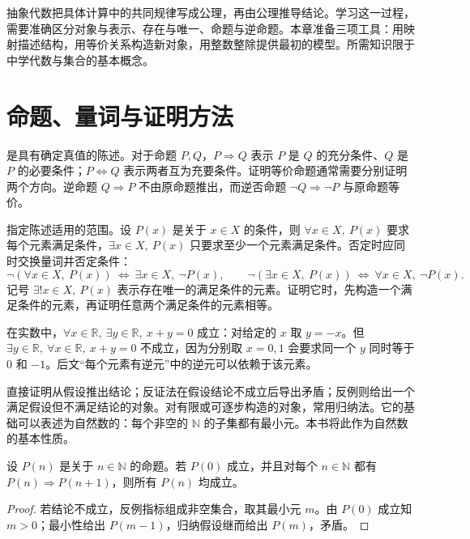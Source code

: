 \documentclass[UTF8,12pt,a4paper,fontset=fandol]{ctexbook}
\begin{document}
抽象代数把具体计算中的共同规律写成公理，再由公理推导结论。学习这一过程，需要准确区分对象与表示、存在与唯一、命题与逆命题。本章准备三项工具：用映射描述结构，用等价关系构造新对象，用整数整除提供最初的模型。所需知识限于中学代数与集合的基本概念。

\section{命题、量词与证明方法}\label{sec:logic}

是具有确定真值的陈述。对于命题 $P,Q$，$P\Rightarrow Q$ 表示 $P$ 是 $Q$ 的充分条件、$Q$ 是 $P$ 的必要条件；$P\Leftrightarrow Q$ 表示两者互为充要条件。证明等价命题通常需要分别证明两个方向。逆命题 $Q\Rightarrow P$ 不由原命题推出，而逆否命题 $\neg Q\Rightarrow\neg P$ 与原命题等价。

指定陈述适用的范围。设 $P(x)$ 是关于 $x\in X$ 的条件，则 $\forall x\in X,\ P(x)$ 要求每个元素满足条件，$\exists x\in X,\ P(x)$ 只要求至少一个元素满足条件。否定时应同时交换量词并否定条件：
\[
  \neg(\forall x\in X,\ P(x))\ \Longleftrightarrow\
  \exists x\in X,\ \neg P(x),\qquad
  \neg(\exists x\in X,\ P(x))\ \Longleftrightarrow\
  \forall x\in X,\ \neg P(x).
\]
记号 $\exists!x\in X,\ P(x)$ 表示存在唯一的满足条件的元素。证明它时，先构造一个满足条件的元素，再证明任意两个满足条件的元素相等。

\begin{example}[量词顺序]
在实数中，$\forall x\in\mathbb R,\ \exists y\in\mathbb R,\ x+y=0$ 成立：对给定的 $x$ 取 $y=-x$。但 $\exists y\in\mathbb R,\ \forall x\in\mathbb R,\ x+y=0$ 不成立，因为分别取 $x=0,1$ 会要求同一个 $y$ 同时等于 $0$ 和 $-1$。后文“每个元素有逆元”中的逆元可以依赖于该元素。
\end{example}

直接证明从假设推出结论；反证法在假设结论不成立后导出矛盾；反例则给出一个满足假设但不满足结论的对象。对有限或可逐步构造的对象，常用归纳法。它的基础可以表述为自然数的：每个非空的 $\mathbb N$ 的子集都有最小元。本书将此作为自然数的基本性质。

\begin{proposition}[数学归纳法]\label{prop:induction}
设 $P(n)$ 是关于 $n\in\mathbb N$ 的命题。若 $P(0)$ 成立，并且对每个 $n\in\mathbb N$ 都有 $P(n)\Rightarrow P(n+1)$，则所有 $P(n)$ 均成立。
\end{proposition}
\begin{proof}
若结论不成立，反例指标组成非空集合，取其最小元 $m$。由 $P(0)$ 成立知 $m>0$；最小性给出 $P(m-1)$，归纳假设继而给出 $P(m)$，矛盾。
\end{proof}
\end{document}
